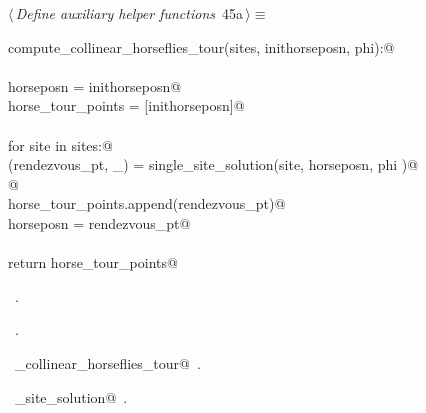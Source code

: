\documentclass[11.5pt]{report}
\begin{document}

\begin{flushleft} \small
\begin{minipage}{\linewidth}\label{scrap67}\raggedright\small
{} $\langle\,${\itshape Define auxiliary helper functions}\nobreak\ {\footnotesize {45a}}$\,\rangle\equiv$
\vspace{-1ex}
\begin{list}{}{} \item
\mbox{}\verb@def compute_collinear_horseflies_tour(sites, inithorseposn, phi):@\\
\mbox{}\verb@@\\
\mbox{}\verb@      horseposn         = inithorseposn@\\
\mbox{}\verb@      horse_tour_points = [inithorseposn]@\\
\mbox{}\verb@@\\
\mbox{}\verb@      for site in sites:@\\
\mbox{}\verb@          (rendezvous_pt, _) = single_site_solution(site, horseposn, phi )@\\
\mbox{}\verb@            @\\
\mbox{}\verb@          horse_tour_points.append(rendezvous_pt)@\\
\mbox{}\verb@          horseposn = rendezvous_pt@\\
\mbox{}\verb@@\\
\mbox{}\verb@      return horse_tour_points@\\
\mbox{}\verb@@{\NWsep}
\end{list}
\vspace{-1.5ex}
\footnotesize
\begin{list}{}{\setlength{\itemsep}{-\parsep}\setlength{\itemindent}{-\leftmargin}}
\item \NWtxtMacroDefBy\ .
\item \NWtxtMacroRefIn\ .
\item \NWtxtIdentsDefed\nobreak\  \verb@compute_collinear_horseflies_tour@\nobreak\ .\item \NWtxtIdentsUsed\nobreak\  \verb@single_site_solution@\nobreak\ .
\item{}
\end{list}
\end{minipage}\vspace{4ex}
\end{flushleft}
\end{document}
